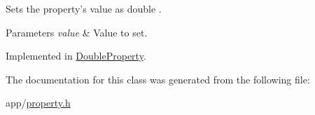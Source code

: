 Sets the property's value as double . 


\begin{DoxyParams}{Parameters}
{\em value} & Value to set. \\
\hline
\end{DoxyParams}


Implemented in \hyperlink{class_double_property_a1ae2a71c28ab126ac5eeceffdcdf4226}{Double\-Property}.



The documentation for this class was generated from the following file\-:\begin{DoxyCompactItemize}
\item 
app/\hyperlink{property_8h}{property.\-h}\end{DoxyCompactItemize}
